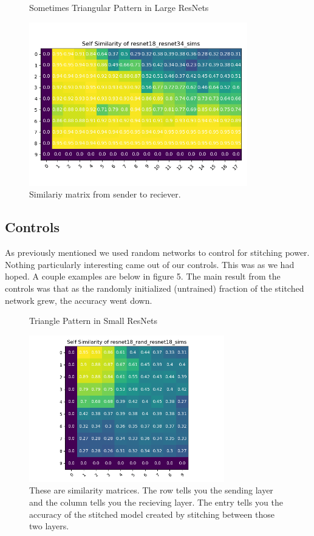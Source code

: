 \documentclass{article} %
\begin{document}
\begin{center}
   \begin{figure}[h!]
      \centering
      \caption{Sometimes Triangular Pattern in Large ResNets}
      \includegraphics[width=9.5cm]{resnet18_resnet34_sims.png}
      \caption*{Similariy matrix from sender to reciever.}
   \end{figure}
\end{center}

\subsection*{Controls}
As previously mentioned we used random networks to control for stitching power. Nothing particularly interesting
came out of our controls. This was as we had hoped. A couple examples are below in figure 5. The main result from the controls
was that as the randomly initialized (untrained) fraction of the stitched network grew, the accuracy went down.

\begin{center}
   \begin{figure}[h!]
      \centering
      \caption{Triangle Pattern in Small ResNets}
      \includegraphics[width=8.5cm]{resnet18_rand_resnet18_sims.png}
      \caption*{These are similarity matrices. The row tells you the sending layer and the column tells you the recieving layer.
      The entry tells you the accuracy of the stitched model created by stitching between those two layers.}
   \end{figure}
\end{center}
\end{document}
